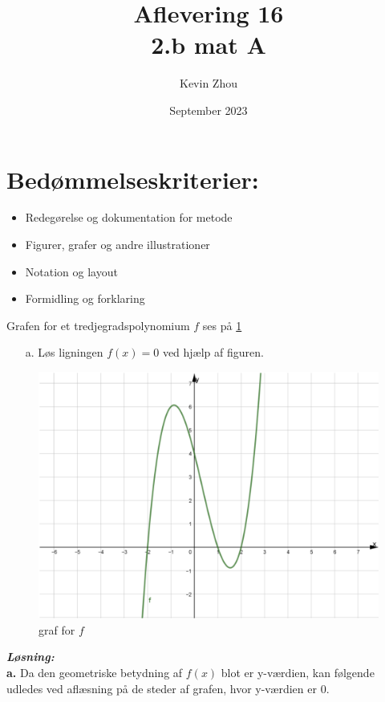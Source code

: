 \documentclass{article}
\title{Aflevering 16\\
{\Large \textbf{2.b mat A}}}
\author{Kevin Zhou}
\date{September 2023}
\newcommand{\sol}{\setlength{\parindent}{0cm}\textbf{\textit{Løsning:}}\setlength{\parindent}{1cm}}
\begin{document}
\maketitle
\section*{Bedømmelseskriterier:}
\begin{itemize}
    \setlength\itemsep{3cm}
    \Large
    \item  Redegørelse og dokumentation for metode
    \item Figurer, grafer og andre illustrationer
    \item Notation og layout
    \item Formidling og forklaring
\end{itemize}
\pagebreak
\begin{question}{}{}
  Grafen for et tredjegradspolynomium $f$ ses på \cref{fig:1}
\begin{itemize}
  \item[a.] Løs ligningen $f(x)=0$ ved hjælp af figuren. 
\end{itemize}
\end{question}
\begin{figure}[h]
  \begin{center}
    \includegraphics[scale=0.5]{mat16.1.png}
  \end{center}
  \caption{graf for $f$}
  \label{fig:1}
  \end{figure}
\sol \\ 
\textbf{a.} Da den geometriske betydning af $f(x)$ blot er y-værdien, kan følgende udledes ved aflæsning på de steder af grafen, hvor y-værdien er $0$.
\end{document}
